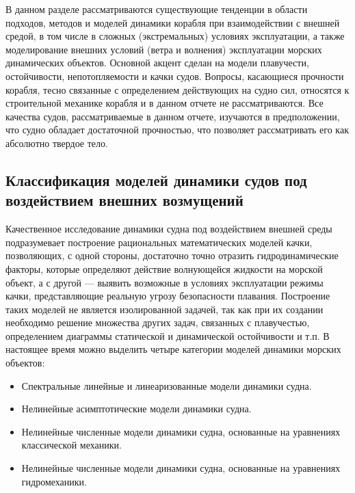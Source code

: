 В данном разделе рассматриваются существующие тенденции в области подходов, методов и моделей динамики корабля при взаимодействии с внешней средой, в том числе в сложных (экстремальных) условиях эксплуатации, а также моделирование внешних условий (ветра и волнения) эксплуатации морских динамических объектов. Основной акцент сделан на модели плавучести, остойчивости, непотопляемости и качки судов. Вопросы, касающиеся прочности корабля, тесно связанные с определением действующих на судно сил, относятся к строительной механике корабля и в данном отчете не рассматриваются. Все качества судов, рассматриваемые в данном отчете, изучаются в предположении, что судно обладает достаточной прочностью, что позволяет рассматривать его как абсолютно твердое тело.

\subsection{Классификация моделей динамики судов под воздействием внешних возмущений}

Качественное исследование динамики судна под воздействием внешней среды подразумевает построение рациональных математических моделей качки, позволяющих, с одной стороны, достаточно точно отразить гидродинамические факторы, которые определяют действие волнующейся жидкости на морской объект, а с другой --- выявить возможные в условиях эксплуатации режимы качки, представляющие реальную угрозу безопасности плавания. Построение таких моделей не является изолированной задачей, так как при их создании необходимо решение множества других задач, связанных с плавучестью, определением диаграммы статической и динамической остойчивости и т.п.  В настоящее время можно выделить четыре категории моделей динамики морских объектов:

\begin{itemize}
	\item	Спектральные линейные и линеаризованные модели динамики судна.
	\item	Нелинейные асимптотические модели динамики судна.
	\item	Нелинейные численные модели динамики судна, основанные на уравнениях классической механики.
	\item	Нелинейные численные модели динамики судна, основанные на уравнениях гидромеханики.
\end{itemize}

